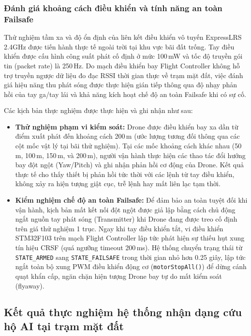 \subsubsection{Đánh giá khoảng cách điều khiển và tính năng an toàn Failsafe}

Thử nghiệm tầm xa và độ ổn định của liên kết điều khiển vô tuyến ExpressLRS 2.4GHz được tiến hành thực tế ngoài trời tại khu vực bãi đất trống. Tay điều khiển được cấu hình công suất phát cố định ở mức 100\,mW và tốc độ truyền gói tin (packet rate) là 250\,Hz. Do mạch điều khiển bay Flight Controller không hỗ trợ truyền ngược dữ liệu đo đạc RSSI thời gian thực về trạm mặt đất, việc đánh giá hiệu năng thu phát sóng được thực hiện gián tiếp thông qua độ nhạy phản hồi của tay ga/tay lái và khả năng kích hoạt chế độ an toàn Failsafe khi có sự cố.

Các kịch bản thực nghiệm được thực hiện và ghi nhận như sau:
\begin{itemize}
    \item \textbf{Thử nghiệm phạm vi kiểm soát:} Drone được điều khiển bay xa dần từ điểm xuất phát đến khoảng cách 200\,m (ước lượng tương đối thông qua các cột mốc vật lý tại bãi thử nghiệm). Tại các mốc khoảng cách khác nhau (50\,m, 100\,m, 150\,m, và 200\,m), người vận hành thực hiện các thao tác đổi hướng bay đột ngột (Yaw/Pitch) và ghi nhận phản hồi cơ động của Drone. Kết quả thực tế cho thấy thiết bị phản hồi tức thời với các lệnh từ tay điều khiển, không xảy ra hiện tượng giật cục, trễ lệnh hay mất liên lạc tạm thời.
    \item \textbf{Kiểm nghiệm chế độ an toàn Failsafe:} Để đảm bảo an toàn tuyệt đối khi vận hành, kịch bản mất kết nối đột ngột được giả lập bằng cách chủ động ngắt nguồn tay phát sóng (Transmitter) khi Drone đang được treo cố định trên giá thử nghiệm 1 trục. Ngay khi tay điều khiển tắt, vi điều khiển STM32F103 trên mạch Flight Controller lập tức phát hiện sự thiếu hụt xung tín hiệu CRSF (quá ngưỡng timeout 200\,ms). Hệ thống chuyển trạng thái từ \texttt{STATE\_ARMED} sang \texttt{STATE\_FAILSAFE} trong thời gian nhỏ hơn 0.25 giây, lập tức ngắt toàn bộ xung PWM điều khiển động cơ (\texttt{motorStopAll()}) để dừng cánh quạt khẩn cấp, ngăn chặn hiện tượng Drone bay tự do mất kiểm soát (flyaway).
\end{itemize}

\subsection{Kết quả thực nghiệm hệ thống nhận dạng cứu hộ AI tại trạm mặt đất}


